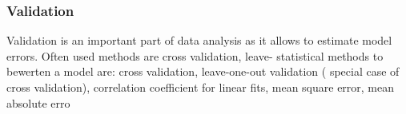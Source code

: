 \iffalse
\textbf{Assumptions of ANOVA}
from \url{https://statsandr.com/blog/anova-in-r/}
\begin{itemize}
    \item variable type: continuous dependent variable and categorial qualitative independent variable (also called treatments or levels). The input variables are discretized an can therefore be seen as categorial.
    \item Independence: groups and levels should be independent
    \item Normality: the residual (that is the durchschnittliche dependance of uncontrollable variables ,like room temperature or humidity) should approximately follow a normal distribution. 
    \item Equality of variance: variance in differenct groups should be equal (compare with homoscedasticity).
    \item No outliers
\end{itemize}
\fi

\subsubsection{Validation}
Validation is an important part of data analysis as it allows to estimate model errors. 
Often used methods are cross validation, leave-
statistical methods to bewerten a model are: 
cross validation, leave-one-out validation ( special case of cross validation), correlation coefficient for linear fits, mean square error, mean absolute erro

